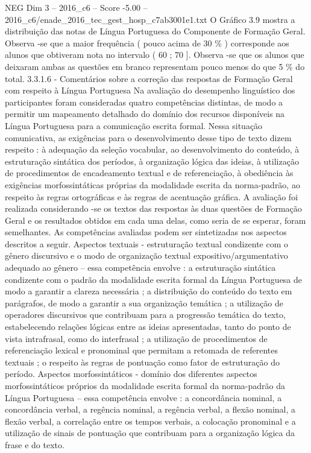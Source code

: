 \begin{textsample}{NEG Dim 3 – 2016\_c6 – Score -5.00 – 2016\_c6/enade\_2016\_tec\_gest\_hosp\_c7ab3001e1.txt}
O Gráfico 3.9 mostra a distribuição das notas de Língua Portuguesa do Componente de Formação Geral.
Observa -se que a maior frequência ( pouco acima de 30 \% ) corresponde aos alunos que obtiveram nota no intervalo ( 60 ; 70 ].
Observa -se que os alunos que deixaram ambas as questões em branco representam pouco menos do que 5 \% do total. 3.3.1.6 - Comentários sobre a correção das respostas de Formação Geral com respeito à Língua Portuguesa Na avaliação do desempenho linguístico dos participantes foram consideradas quatro competências distintas, de modo a permitir um mapeamento detalhado do domínio dos recursos disponíveis na Língua Portuguesa para a comunicação escrita formal.
Nessa situação comunicativa, as exigências para o desenvolvimento desse tipo de texto dizem respeito : à adequação da seleção vocabular, ao desenvolvimento do conteúdo, à estruturação sintática dos períodos, à organização lógica das ideias, à utilização de procedimentos de encadeamento textual e de referenciação, à obediência às exigências morfossintáticas próprias da modalidade escrita da norma-padrão, ao respeito às regras ortográficas e às regras de acentuação gráfica.
A avaliação foi realizada considerando -se os textos das respostas às duas questões de Formação Geral e os resultados obtidos em cada uma delas, como seria de se esperar, foram semelhantes.
As competências avaliadas podem ser sintetizadas nos aspectos descritos a seguir.
Aspectos textuais - estruturação textual condizente com o gênero discursivo e o modo de organização textual expositivo/argumentativo adequado ao gênero – essa competência envolve : a estruturação sintática condizente com o padrão da modalidade escrita formal da Língua Portuguesa de modo a garantir a clareza necessária ; a distribuição do conteúdo do texto em parágrafos, de modo a garantir a sua organização temática ; a utilização de operadores discursivos que contribuam para a progressão temática do texto, estabelecendo relações lógicas entre as ideias apresentadas, tanto do ponto de vista intrafrasal, como do interfrasal ; a utilização de procedimentos de referenciação lexical e pronominal que permitam a retomada de referentes textuais ; o respeito às regras de pontuação como fator de estruturação do período.
Aspectos morfossintáticos - domínio dos diferentes aspectos morfossintáticos próprios da modalidade escrita formal da norma-padrão da Língua Portuguesa – essa competência envolve : a concordância nominal, a concordância verbal, a regência nominal, a regência verbal, a flexão nominal, a flexão verbal, a correlação entre os tempos verbais, a colocação pronominal e a utilização de sinais de pontuação que contribuam para a organização lógica da frase e do texto.

\end{textsample}
